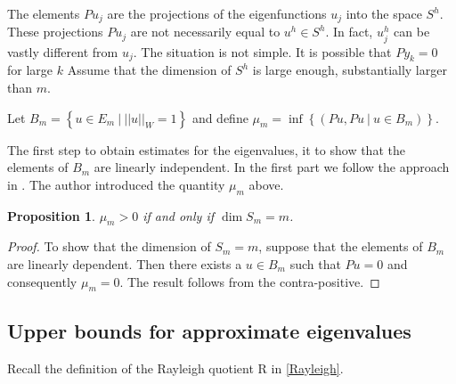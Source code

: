 \documentclass[../../main.tex]{subfiles}
\begin{document}
The elements $Pu_j$ are the projections of the eigenfunctions $u_j$ into the space $S^h$. These projections $Pu_j$ are not necessarily equal to $u^h \in S^h$. In fact, $u^h_j$  can be vastly different from $u_j$. The situation is not simple. It is possible that $Py_k = 0$ for large $k$ Assume that the dimension of $S^h$ is large enough, substantially larger than $m$.

Let $B_m = \left\{u \in E_m \ | \ ||u||_{W} = 1 \right\}$ and define $\mu_m = \inf\left\{(Pu,Pu \ | \ u \in B_m)\right\}$.

The first step to obtain estimates for the eigenvalues, it to show that the elements of $B_m$ are linearly independent. In the first part we follow the approach in \cite{Zie2000}. The author introduced the quantity $\mu_m$ above.

\newtheorem{Prop_1}{Proposition}
\begin{Prop_1}
 $\mu_{m} > 0$ if and only if $\dim S_{m} = m$. \label{sym:mu}
\end{Prop_1}
\begin{proof}
	To show that the dimension of $S_m = m$, suppose that the elements of $B_m$ are linearly dependent. Then there exists a $u \in B_m$ such that $Pu = 0$ and consequently $\mu_m = 0$. The result follows from the contra-positive.
\end{proof}

\subsection{Upper bounds for approximate eigenvalues}

 Recall the definition of the Rayleigh quotient R in \eqref{Rayleigh}.
\end{document}
